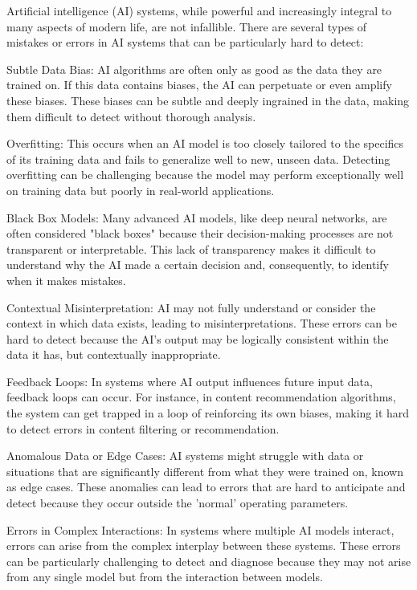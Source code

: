 \begin{aibox}
Artificial intelligence (AI) systems, while powerful and increasingly integral to many aspects of modern life, are not infallible. There are several types of mistakes or errors in AI systems that can be particularly hard to detect:

Subtle Data Bias: AI algorithms are often only as good as the data they are trained on. If this data contains biases, the AI can perpetuate or even amplify these biases. These biases can be subtle and deeply ingrained in the data, making them difficult to detect without thorough analysis.

Overfitting: This occurs when an AI model is too closely tailored to the specifics of its training data and fails to generalize well to new, unseen data. Detecting overfitting can be challenging because the model may perform exceptionally well on training data but poorly in real-world applications.

Black Box Models: Many advanced AI models, like deep neural networks, are often considered "black boxes" because their decision-making processes are not transparent or interpretable. This lack of transparency makes it difficult to understand why the AI made a certain decision and, consequently, to identify when it makes mistakes.

Contextual Misinterpretation: AI may not fully understand or consider the context in which data exists, leading to misinterpretations. These errors can be hard to detect because the AI's output may be logically consistent within the data it has, but contextually inappropriate.

Feedback Loops: In systems where AI output influences future input data, feedback loops can occur. For instance, in content recommendation algorithms, the system can get trapped in a loop of reinforcing its own biases, making it hard to detect errors in content filtering or recommendation.

Anomalous Data or Edge Cases: AI systems might struggle with data or situations that are significantly different from what they were trained on, known as edge cases. These anomalies can lead to errors that are hard to anticipate and detect because they occur outside the 'normal' operating parameters.

Errors in Complex Interactions: In systems where multiple AI models interact, errors can arise from the complex interplay between these systems. These errors can be particularly challenging to detect and diagnose because they may not arise from any single model but from the interaction between models.


\end{aibox}
